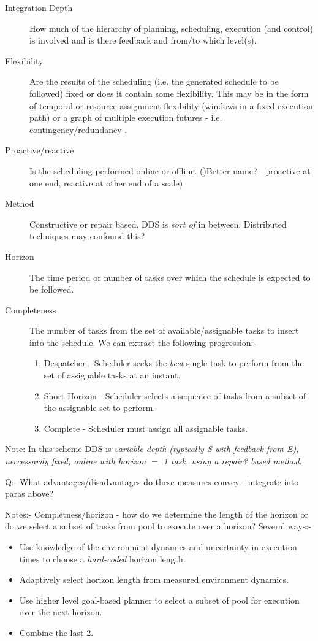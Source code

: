 \begin{description}
\item[Integration Depth] How much of the hierarchy of planning, scheduling, execution (and control) is involved and is there feedback and from/to which level(s).
\item[Flexibility] Are the results of the scheduling (i.e. the generated schedule to be followed) fixed or does it contain some flexibility. This may be in the form of temporal or resource assignment flexibility (windows in a fixed execution path) or a graph of multiple execution futures - i.e. contingency/redundancy .
\item[Proactive/reactive] Is the scheduling performed online or offline. ()Better name? - proactive at one end, reactive at other end of a scale)
\item[Method] Constructive or repair based, DDS is \emph{sort of} in between. Distributed techniques may confound this?. 
\item[Horizon] The time period or number of tasks over which the schedule is expected to be followed.
\item[Completeness] The number of tasks from the set of available/assignable tasks to insert into the schedule.
We can extract the following progression:-
\begin{enumerate}
\item Despatcher - Scheduler seeks the \emph{best} single task to perform from the set of assignable tasks at an instant.
\item Short Horizon - Scheduler selects a sequence of tasks from a subset of the assignable set to perform.
\item Complete - Scheduler must assign all assignable tasks.
\end{enumerate}
\end{description}

Note: In this scheme DDS is \emph{variable depth (typically S with feedback from E), neccessarily fixed, online with horizon $=$ 1 task, using a repair? based method}. 

Q:- What advantages/disadvantages do these measures convey - integrate into paras above?

Notes:- Completness/horizon - how do we determine the length of the horizon or do we select a subset of tasks from pool to execute over a horizon? Several ways:-
\begin{itemize}
\item Use knowledge of the environment dynamics and uncertainty in execution times to choose a \emph{hard-coded} horizon length.
\item Adaptively select horizon length from measured environment dynamics.
\item Use higher level goal-based planner to select a subset of pool for execution over the next horizon.
\item Combine the last 2.
\end{itemize}


